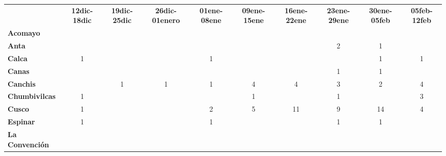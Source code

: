 \begin{tabular}{lccccccccc}
	&\textbf{12dic-18dic}			&\textbf{19dic-25dic}
	&\textbf{26dic-01enero}						&\textbf{01ene-08ene}			&\textbf{09ene-15ene}
	&\textbf{16ene-22ene}						&\textbf{23ene-29ene}			&\textbf{30ene-05feb}
	&\textbf{05feb-12feb}\\
	\textbf{Acomayo}                        	
	&\cellcolor[HTML]{FCC46C}                   &\cellcolor[HTML]{FCC46C}  			        &\cellcolor[HTML]{FCC46C}          			&\cellcolor[HTML]{FCC46C} 					&\cellcolor[HTML]{FCC46C} 	    			&\cellcolor[HTML]{FCC46C}				    &\cellcolor[HTML]{FCC46C}
	&\cellcolor[HTML]{FCC46C}					&\cellcolor[HTML]{FCC46C}\\
	\textbf{Anta}                                                          							
	&\cellcolor[HTML]{FCC46C}					
	&\cellcolor[HTML]{FCC46C}					&\cellcolor[HTML]{FCC46C} 
	&\cellcolor[HTML]{FCC46C}					&\cellcolor[HTML]{FCC46C}
	&\cellcolor[HTML]{FCC46C}					&2 				&1
	&\cellcolor[HTML]{FCC46C}	\\
	\textbf{Calca}      				       
	&1 								            
	&\cellcolor[HTML]{FCC46C}					&\cellcolor[HTML]{FCC46C} 
	&1											&\cellcolor[HTML]{FCC46C}	&\cellcolor[HTML]{FCC46C}					&\cellcolor[HTML]{FCC46C}
	&1 											&1\\                										
	\textbf{Canas}                              
	&\cellcolor[HTML]{FCC46C} 
	&\cellcolor[HTML]{FCC46C} 					&\cellcolor[HTML]{FCC46C} 		&\cellcolor[HTML]{FCC46C}					&\cellcolor[HTML]{FCC46C} 		
	&\cellcolor[HTML]{FCC46C}					&1
	&1											&\cellcolor[HTML]{FCC46C}\\
	\textbf{Canchis}                            
	&\cellcolor[HTML]{FCC46C} 		
	&1											&1
	&1											&4
	&4											&3
	&2											&4\\
	\textbf{Chumbivilcas}                      
	&1			
	&\cellcolor[HTML]{FCC46C}					&\cellcolor[HTML]{FCC46C}
	&\cellcolor[HTML]{FCC46C}					&1
	&\cellcolor[HTML]{FCC46C} 					&1
	&\cellcolor[HTML]{FCC46C}					&3\\
	\textbf{Cusco}                             											
	&1								&\cellcolor[HTML]{FCC46C}											
	&\cellcolor[HTML]{FCC46C}					
	&2											&5
	&11											&9 	
	&14 										&4\\
	\textbf{Espinar}       					                 						   		 
	&1											&\cellcolor[HTML]{FCC46C}									
	&\cellcolor[HTML]{FCC46C}				    &1
	&\cellcolor[HTML]{FCC46C} 					&\cellcolor[HTML]{FCC46C}
	&1											&1
	&\cellcolor[HTML]{FCC46C}\\
	\textbf{La Convención}                      		

\end{tabular}
